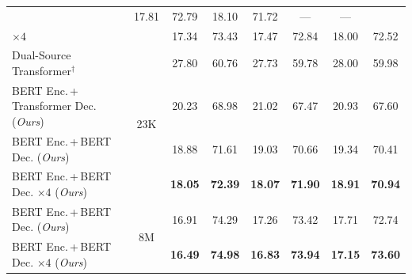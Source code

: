 \begin{landscape}
\begin{table}[t]
\begin{tabular}{lccccccc}
            \multicolumn{1}{c}{}                             &
            17.81                                            & 72.79          & 18.10                         & 71.72          & ---   & ---   \\
            \citet{junczys2018ms}$\times 4$                  &
            \multicolumn{1}{c}{}                             &
            17.34                                            & 73.43          & 17.47                         & 72.84          & 18.00 & 72.52 \\
            \midrule
            \midrule
            Dual-Source Transformer$^\dagger$                &
            \multicolumn{1}{c}{\multirow{4}{*}{23K}}         &
            27.80                                            & 60.76          & 27.73                         & 59.78          & 28.00 & 59.98 \\
            BERT Enc.\,+\,Transformer Dec. (\emph{Ours})     &
            \multicolumn{1}{c}{}                             &
            20.23                                            & 68.98          & 21.02                         & 67.47          & 20.93 & 67.60 \\
            BERT Enc.\,+\,BERT Dec. (\emph{Ours})            &
            \multicolumn{1}{c}{}                             &
            18.88                                            & 71.61          & 19.03                         & 70.66          & 19.34 & 70.41 \\
            BERT Enc.\,+\,BERT Dec. $\times 4$ (\emph{Ours}) &
            \multicolumn{1}{c}{}                             &
            \textbf{18.05}                                   & \textbf{72.39} & \textbf{18.07}                &
            \textbf{71.90}                                   & \textbf{18.91} & \textbf{70.94}                                                 \\
            \midrule
            BERT Enc.\,+\,BERT Dec. (\emph{Ours})            &
            \multicolumn{1}{c}{\multirow{2}{*}{8M}}          &
            16.91                                            & 74.29          & 17.26                         & 73.42          & 17.71 & 72.74 \\
            BERT Enc.\,+\,BERT Dec. $\times 4$ (\emph{Ours}) &
            \multicolumn{1}{c}{}                             &
            \textbf{16.49}                                   & \textbf{74.98} & \textbf{16.83}                &
            \textbf{73.94}                                   & \textbf{17.15} & \textbf{73.60}                                                 \\

\end{tabular}
\end{table}
\end{landscape}
